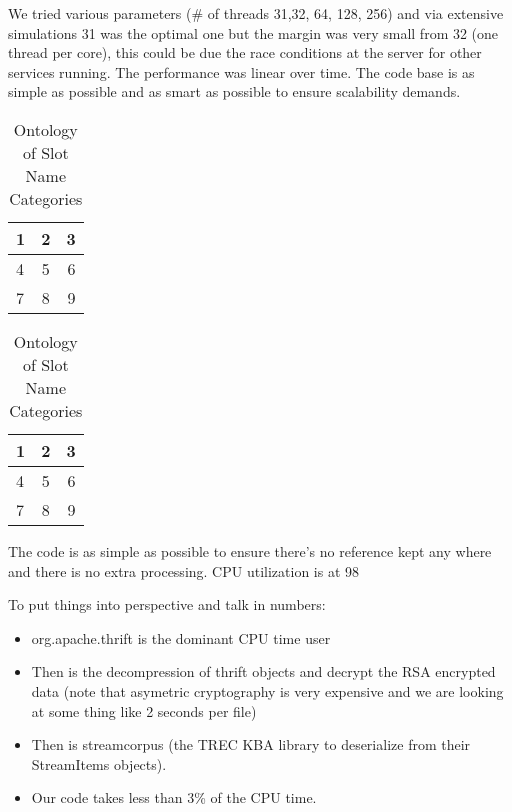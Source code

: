 We tried various parameters (\# of threads 31,32, 64, 128, 256) and via extensive simulations 31 was the optimal one but the margin was very small from 32 (one thread per core), this could be due the race conditions at the server for other services running. The performance was linear over time. The code base is as simple as possible and as smart as possible to ensure scalability demands. 

\begin{table}
\caption{Ontology of Slot Name Categories }
\centering
\begin{tabular}[c]{ |l| c |r| } \hline
  1 & 2 & 3 \\\hline
  4 & 5 & 6 \\\hline
  7 & 8 & 9 \\\hline
\end{tabular}
\end{table}

\begin{table}
\caption{Ontology of Slot Name Categories }
\centering
\begin{tabular}[c]{ |l| c |r| } \hline
  1 & 2 & 3 \\\hline
  4 & 5 & 6 \\\hline
  7 & 8 & 9 \\\hline
\end{tabular}
\end{table}

The code is as simple as possible to ensure there's no reference kept any where and there is no extra processing. CPU utilization is at 98%

To put things into perspective and talk in numbers: 

\begin{itemize}
  \item org.apache.thrift is the dominant CPU time user 
\item Then is the decompression of thrift objects and decrypt the RSA encrypted data (note that asymetric cryptography is very expensive and we are looking at some thing like 2 seconds per file)
\item Then is streamcorpus (the TREC KBA library to deserialize from their StreamItems objects). 
\item Our code takes less than 3\% of the CPU time. 
\end{itemize}


